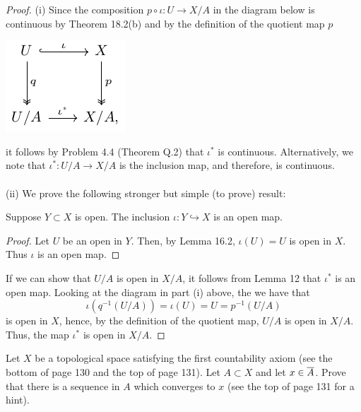 \begin{proof}
(i) Since the composition $p\circ\iota\colon U\to X/A$ in
the diagram below is continuous by Theorem 18.2(b) and by the
definition of the quotient map $p$
\begin{center}
\includegraphics{figures/hw4-quotient-diagram}
\end{center}
it follows by Problem 4.4 (Theorem Q.2) that $\iota^*$ is
continuous. Alternatively, we note that $\iota^*\colon U/A\to
X/A$ is the inclusion map, and therefore, is continuous.
\\\\
(ii) We prove the following stronger but simple (to prove) result:
\begin{lemma}
Suppose $Y\subset X$ is open. The inclusion $\iota\colon Y\hookrightarrow X$ is
an open map.
\end{lemma}
\begin{proof}
\renewcommand\qedsymbol{$\clubsuit$}
Let $U$ be an open in $Y$. Then, by Lemma 16.2, $\iota(U)=U$ is open in
$X$. Thus $\iota$ is an open map.
\end{proof}
If we can show that $U/A$ is open in $X/A$, it follows from Lemma
12 that $\iota^*$ is an open map. Looking at the diagram in part
(i) above, the we have that
\[
\iota(q^{-1}(U/A))=\iota(U)=U=p^{-1}(U/A)
\]
is open in $X$, hence, by the definition of the quotient map,
$U/A$ is open in $X/A$. Thus, the map $\iota^*$ is open in
$X/A$.
\end{proof}
\newpage
\begin{problem}[G]
Let $X$ be a topological space satisfying the first countability
axiom (see the bottom of page 130 and the top of page 131). Let
$A\subset X$ and let $x\in\overline{A}$. Prove that there is a
sequence in $A$ which converges to $x$ (see the top of page 131
for a hint).
\end{problem}
